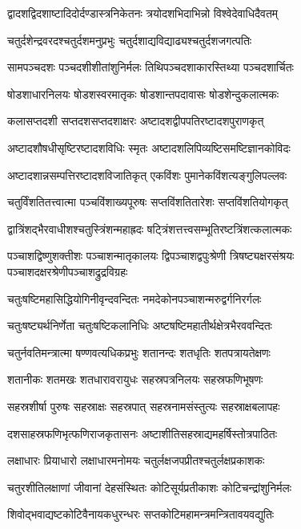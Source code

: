 \twolineshloka
{द्वादशद्विदशाष्टादिदोर्दण्डास्त्रनिकेतनः}
{त्रयोदशभिदाभिन्नो विश्वेदेवाधिदैवतम्}%

\twolineshloka
{चतुर्दशेन्द्रवरदश्चतुर्दशमनुप्रभुः}
{चतुर्दशाद्यविद्याढ्यश्चतुर्दशजगत्पतिः}%

\twolineshloka
{सामपञ्चदशः पञ्चदशीशीतांशुनिर्मलः}
{तिथिपञ्चदशाकारस्तिथ्या पञ्चदशार्चितः}%

\twolineshloka
{षोडशाधारनिलयः षोडशस्वरमातृकः}
{षोडशान्तपदावासः षोडशेन्दुकलात्मकः}%

\twolineshloka
{कलासप्तदशी सप्तदशसप्तदशाक्षरः}
{अष्टादशद्वीपपतिरष्टादशपुराणकृत्}%

\twolineshloka
{अष्टादशौषधीसृष्टिरष्टादशविधिः स्मृतः}
{अष्टादशलिपिव्यष्टिसमष्टिज्ञानकोविदः}%

\twolineshloka
{अष्टादशान्नसम्पत्तिरष्टादशविजातिकृत्}
{एकविंशः पुमानेकविंशत्यङ्गुलिपल्लवः}%

\twolineshloka
{चतुर्विंशतितत्त्वात्मा पञ्चविंशाख्यपूरुषः}
{सप्तविंशतितारेशः सप्तविंशतियोगकृत्}%

\twolineshloka
{द्वात्रिंशद्भैरवाधीशश्चतुस्त्रिंशन्महाह्रदः}
{षट्त्रिंशत्तत्त्वसम्भूतिरष्टत्रिंशत्कलात्मकः}%

\threelineshloka
{पञ्चाशद्विष्णुशक्तीशः पञ्चाशन्मातृकालयः}
{द्विपञ्चाशद्वपुःश्रेणी त्रिषष्ट्यक्षरसंश्रयः}
{पञ्चाशदक्षरश्रेणीपञ्चाशद्रुद्रविग्रहः}%

\twolineshloka
{चतुःषष्टिमहासिद्धियोगिनीवृन्दवन्दितः}
{नमदेकोनपञ्चाशन्मरुद्वर्गनिरर्गलः}%

\twolineshloka
{चतुःषष्ट्यर्थनिर्णेता चतुःषष्टिकलानिधिः}
{अष्टषष्टिमहातीर्थक्षेत्रभैरववन्दितः}%

\twolineshloka
{चतुर्नवतिमन्त्रात्मा षण्णवत्यधिकप्रभुः}
{शतानन्दः शतधृतिः शतपत्रायतेक्षणः}%

\twolineshloka
{शतानीकः शतमखः शतधारावरायुधः}
{सहस्रपत्रनिलयः सहस्रफणिभूषणः}%

\twolineshloka
{सहस्रशीर्षा पुरुषः सहस्राक्षः सहस्रपात्}
{सहस्रनामसंस्तुत्यः सहस्राक्षबलापहः}%

\twolineshloka
{दशसाहस्रफणिभृत्फणिराजकृतासनः}
{अष्टाशीतिसहस्राद्यमहर्षिस्तोत्रपाठितः}%

\twolineshloka
{लक्षाधारः प्रियाधारो लक्षाधारमनोमयः}
{चतुर्लक्षजपप्रीतश्चतुर्लक्षप्रकाशकः}%

\twolineshloka
{चतुरशीतिलक्षाणां जीवानां देहसंस्थितः}
{कोटिसूर्यप्रतीकाशः कोटिचन्द्रांशुनिर्मलः}%

\twolineshloka
{शिवोद्भवाद्यष्टकोटिवैनायकधुरन्धरः}
{सप्तकोटिमहामन्त्रमन्त्रितावयवद्युतिः}%

